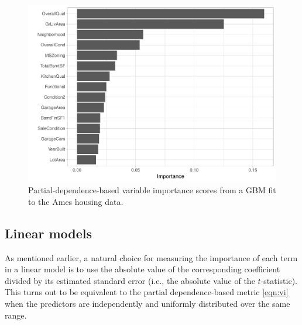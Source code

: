 \documentclass[12pt]{article}
\begin{document}
\begin{figure}[!htb]
  \centering
  \includegraphics[width=1.0\textwidth]{ames-gbm-vip-pd}
  \caption{Partial-dependence-based variable importance scores from a GBM fit to the Ames housing data. \label{fig:ames-gbm-vip-pd}}
\end{figure}


\subsection{Linear models}
\label{sec:linear}

As mentioned earlier, a natural choice for measuring the importance of each term in a linear model is to use the absolute value of the corresponding coefficient divided by its estimated standard error (i.e., the absolute value of the $t$-statistic). This turns out to be equivalent to the partial dependence-based metric \eqref{eqn:vi} when the predictors are independently and uniformly distributed over the same range.
\end{document}

